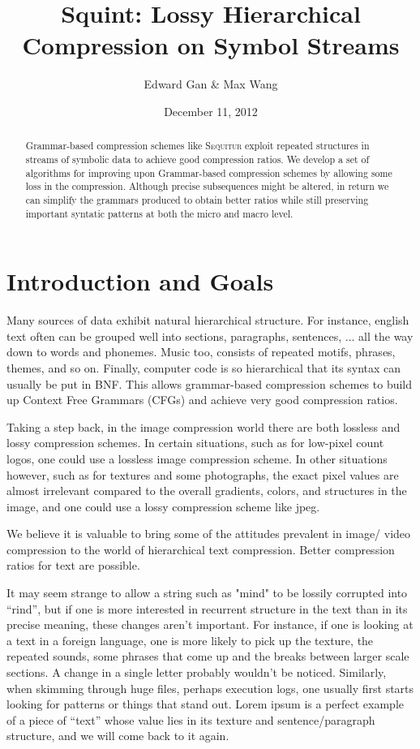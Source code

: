 \documentclass[11pt]{article}
\newcommand{\Sequitur}{\textsc{Sequitur}\xspace}
\begin{document}


\title{Squint: Lossy Hierarchical Compression on Symbol Streams}
\author{Edward Gan \& Max Wang}
\date{December 11, 2012}
\maketitle

\begin{abstract}
Grammar-based compression schemes like \Sequitur exploit repeated structures
in streams of symbolic data to achieve good compression ratios.
We develop a set of algorithms for improving upon Grammar-based compression 
schemes by allowing some loss in the compression. Although precise 
subsequences might be altered, in return we can simplify 
the grammars produced to obtain better ratios while still preserving
important syntatic patterns at both the micro and macro level.
\end{abstract}

\tableofcontents

\section{Introduction and Goals}
Many sources of data exhibit natural hierarchical structure. For instance,
english text often can be grouped well into sections, paragraphs, sentences, ...
all the way down to words and phonemes. Music too, consists of repeated motifs,
phrases, themes, and so on. Finally, computer code is so hierarchical that its
syntax can usually be put in BNF. This allows grammar-based compression schemes
to build up Context Free Grammars (CFGs) and achieve very good compression
ratios.

Taking a step back, in the image compression world there are both lossless and
lossy compression schemes. In certain situations, such as for low-pixel count
logos, one could use a lossless image compression scheme. In other situations
however, such as for textures and some photographs, the exact pixel values
are almost irrelevant compared to the overall gradients, colors, and structures
in the image, and one could use a lossy compression scheme like jpeg.

We believe it is valuable to bring some of the attitudes prevalent in image/
video compression to the world of hierarchical text compression. Better
compression ratios for text are possible. 

It may seem strange to allow a string such as "mind" to be lossily 
corrupted into ``rind'', but if one is more interested in recurrent 
structure in the text than in its precise meaning, these changes 
aren't important. For instance, if one is looking at a text in a foreign
language, one is more likely to pick up the texture, the repeated sounds,
some phrases that come up and the breaks between larger scale sections.
A change in a single letter probably wouldn't be noticed. Similarly,
when skimming through huge files, perhaps execution logs, one usually
first starts looking for patterns or things that stand out. Lorem ipsum
is a perfect example of a piece of ``text'' whose value lies in its texture
and sentence/paragraph structure, and we will come back to it again.
\end{document}

